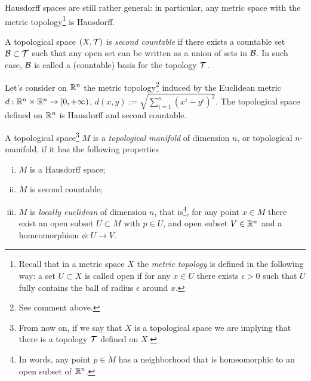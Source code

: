 Hausdorff spaces are still rather general: in particular, any metric space with the metric topology\footnote{Recall that in a metric space $X$ the \emph{metric topology} is defined in the following way: a set $U\subset X$ is called open if for any $x\in U$ there exists $\epsilon>0$ such that $U$ fully contains the ball of radius $\epsilon$ around $x$.} is Hausdorff.

\begin{definition}
  A topological space $(X, \mathcal{T})$ is \emph{second countable} if there exists a countable set $\mathcal{B}\subset\mathcal{T}$ such that any open set can be written as a union of sets in $\mathcal{B}$.
  In such case, $\mathcal{B}$ is called a (countable) basis for the topology $\mathcal{T}$.
\end{definition}

\begin{exercise}\label{exe:rntopsp}
  Let's consider on $\mathbb{R}^n$ the metric topology\footnote{See comment above.} induced by the Euclidean metric $d: \mathbb{R}^n \times \mathbb{R}^n \to [0, +\infty)$, $d(x,y) := \sqrt{\sum_{i=1}^n (x^i-y^i)^2}$.
  The topological space defined on $\mathbb{R}^n$ is Hausdorff and second countable.
\end{exercise}

\begin{definition}
  A topological space\footnote{From now on, if we say that $X$ is a topological space we are implying that there is a topology $\mathcal{T}$ defined on $X$.} $M$ is a \emph{topological manifold} of dimension $n$, or topological $n$-manifold, if it has the following properties
  \begin{enumerate}[(i)]
    \item $M$ is a Hausdorff space;
    \item $M$ is second countable;
    \item $M$ is \emph{locally euclidean} of dimension $n$, that is\footnote{In words, any point $p\in M$ has a neighborhood that is homeomorphic to an open subset of $\mathbb{R}^n$.}, for any point $x\in M$ there exist an open subset $U\subset M$ with $p\in U$, and open subset $V\in\mathbb{R}^n$ and a homeomorphism $\phi: U\to V$.
  \end{enumerate}
\end{definition}

